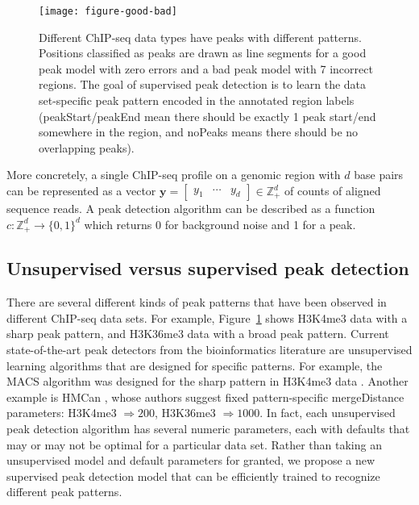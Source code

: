 \documentclass{article}
\newcommand{\ZZ}{\mathbb Z}
\begin{document}
\begin{figure}[b!]
  \centering
  \texttt{[image: figure-good-bad]}
  \vskip -0.5cm
  \caption{Different ChIP-seq data types have peaks with different
    patterns. Positions classified as peaks are drawn as line segments
    for a \textcolor{good}{good peak model} with zero errors and a
    \textcolor{bad}{bad peak model} with 7 incorrect regions. The goal
    of supervised peak detection is to learn the data set-specific
    peak pattern encoded in the annotated region labels
    (\colorbox{peakStart}{peakStart}/\colorbox{peakEnd}{peakEnd} mean
    there should be exactly 1 peak start/end somewhere in the region,
    and \colorbox{noPeaks}{noPeaks} means there should be no
    overlapping peaks).}
  \label{fig:good-bad}
\end{figure}

More concretely, a single ChIP-seq profile on a genomic region with
$d$ base pairs can be represented as a vector $\mathbf y= \left[
  \begin{array}{ccc}
    y_1 & \cdots & y_d
  \end{array}
\right]\in\ZZ_+^d$ of counts of aligned sequence reads. A peak
detection algorithm can be described as a function $c:\ZZ_+^d
\rightarrow \{0, 1\}^d$ which returns 0 for background noise and 1 for
a peak. 

\subsection{Unsupervised versus supervised peak detection}

There are several different kinds of peak patterns that have been
observed in different ChIP-seq data sets. For example,
Figure~\ref{fig:good-bad} shows H3K4me3 data with a sharp peak
pattern, and H3K36me3 data with a broad peak pattern. Current
state-of-the-art peak detectors from the bioinformatics literature are
unsupervised learning algorithms that are designed for specific
patterns. For example, the MACS algorithm was designed for the sharp
pattern in H3K4me3 data \citep{MACS}. Another example is HMCan
\citep{HMCan}, whose authors suggest fixed pattern-specific
mergeDistance parameters: H3K4me3 $\Rightarrow 200$, H3K36me3
$\Rightarrow 1000$. In fact, each unsupervised peak detection
algorithm has several numeric parameters, each with defaults that may
or may not be optimal for a particular data set. Rather than taking an
unsupervised model and default parameters for granted, we propose a
new supervised peak detection model that can be efficiently trained to
recognize different peak patterns.
\end{document}
